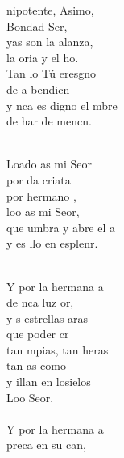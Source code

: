 \begin{cancion}%
	nipotente, Asimo,  \\
	Bondad Ser,\\
	yas son la alanza, \\
	la oria y el ho.\\
	Tan lo Tú eresgno  \\
	de a bendicn\\
	y nca es digno el mbre\\
	de har de mencn. \\\jump\\
	\begin{chorus}%
	Loado as mi Seor\\
	por da criata\\
	por  hermano ,\\
	loo as mi Seor,\\
	que umbra y abre el a \\
	y es llo en esplenr.\\
	\end{chorus}%
	\jump\\
	Y por la hermana a\\
	de nca luz or,\\
	y s estrellas aras \\
	que  poder cr\\
	tan mpias, tan heras\\
	tan as como \\
	y illan en losielos\\
	Loo Seor.\\
\jump\\
	Y por la hermana a \\
	preca en su can,\\

\end{cancion}
